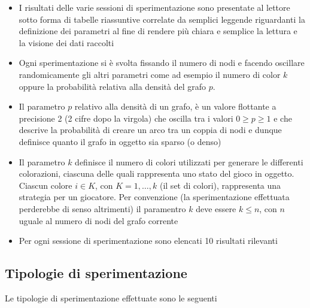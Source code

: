 \begin{itemize}
	\item I risultati delle varie sessioni di sperimentazione sono presentate al lettore sotto forma di tabelle riassuntive correlate da semplici leggende riguardanti la definizione dei parametri al fine di rendere più chiara e semplice la lettura e la visione dei dati raccolti
	\item Ogni sperimentazione si è svolta fissando il numero di nodi e facendo oscillare randomicamente gli altri parametri come ad esempio il numero di color $k$ oppure la probabilità relativa alla densità del grafo $p$.\\
	\item Il parametro $p$ relativo alla densità di un grafo, è un valore flottante a precisione 2 (2 cifre dopo la virgola) che oscilla tra i valori \(0 \geq p \geq 1\) e che descrive la probabilità di creare un arco tra un coppia di nodi e dunque definisce quanto il grafo in oggetto sia sparso (o denso)
	\item Il parametro $k$ definisce il numero di colori utilizzati per generare le differenti colorazioni, ciascuna delle quali rappresenta uno stato del gioco in oggetto. Ciascun colore \(i \in K\), con \(K = 1,\ldots,k\) (il set di colori), rappresenta una strategia per un giocatore. Per convenzione (la sperimentazione effettuata perderebbe di senso altrimenti) il paramentro $k$ deve essere \(k \leq n\), con $n$ uguale al numero di nodi del grafo corrente
	\item Per ogni sessione di sperimentazione sono elencati 10 risultati rilevanti
\end{itemize}

\subsection{Tipologie di sperimentazione}
\justify
Le tipologie di sperimentazione effettuate sono le seguenti

